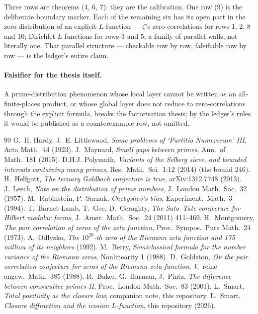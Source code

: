 \documentclass[11pt]{article}
\theoremstyle{remark}
\begin{document}
Three rows are theorems (4, 6, 7): they are the calibration. One row (9) is
the deliberate boundary marker. Each of the remaining six has its open part
in the zero distribution of an explicit $L$-function --- $\zeta$'s zero
correlations for rows 1, 2, 8 and 10; Dirichlet $L$-functions for rows 3
and 5; a family of parallel walls, not literally one. That parallel
structure --- checkable row by row, falsifiable row by row --- is the
ledger's entire claim.

\paragraph{Falsifier for the thesis itself.} A prime-distribution phenomenon
whose local layer cannot be written as an all-finite-places product, or whose
global layer does not reduce to zero-correlations through the explicit
formula, breaks the factorisation thesis; by the ledger's rules it would be
published as a counterexample row, not omitted.

\begin{thebibliography}{99}\small
{} G.~H. Hardy, J.~E. Littlewood,
\emph{Some problems of `Partitio Numerorum' III}, Acta Math.\ 44 (1923).
 J.~Maynard, \emph{Small gaps between primes},
Ann.\ of Math.\ 181 (2015).
 D.H.J. Polymath, \emph{Variants of the Selberg
sieve, and bounded intervals containing many primes}, Res.\ Math.\
Sci.\ 1:12 (2014) (the bound 246).
 H.~Helfgott, \emph{The ternary Goldbach conjecture is
true}, arXiv:1312.7748 (2013).
 J.~Leech, \emph{Note on the distribution of prime numbers},
J.~London Math.\ Soc.\ 32 (1957).
 M.~Rubinstein, P.~Sarnak,
\emph{Chebyshev's bias}, Experiment.\ Math.\ 3 (1994).
 T.~Barnet-Lamb, T.~Gee, D.~Geraghty, \emph{The Sato--Tate
conjecture for Hilbert modular forms}, J.~Amer.\ Math.\ Soc.\ 24 (2011)
411--469.
 H.~Montgomery, \emph{The pair correlation of zeros of
the zeta function}, Proc.\ Sympos.\ Pure Math.\ 24 (1973).
 A.~Odlyzko, \emph{The $10^{20}$-th zero of the Riemann
zeta function and 175 million of its neighbors} (1992).
 M.~Berry, \emph{Semiclassical formula for the number
variance of the Riemann zeros}, Nonlinearity 1 (1988).
 D.~Goldston, \emph{On the pair correlation conjecture
for zeros of the Riemann zeta-function}, J.~reine angew.\ Math.\ 385 (1988).
\bibitem{BHP} R.~Baker, G.~Harman, J.~Pintz, \emph{The difference between
consecutive primes II}, Proc.\ London Math.\ Soc.\ 83 (2001).
 L.~Smart, \emph{Total positivity as the closure
law}, companion note, this repository.
 L.~Smart, \emph{Closure diffraction and the
icosian $L$-function}, this repository (2026).
\end{thebibliography}
\end{document}

